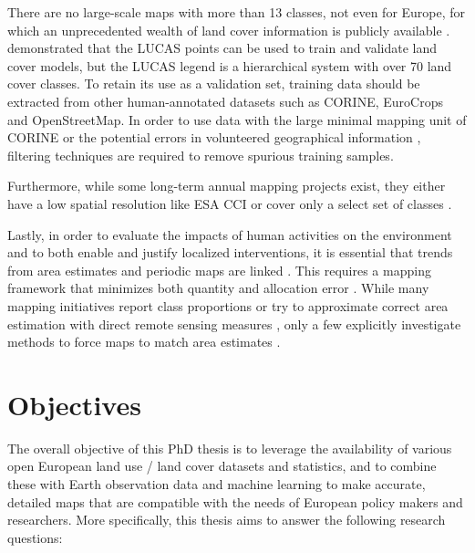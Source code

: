     There are no large-scale maps with more than 13 classes, not even for Europe, for which an unprecedented wealth of land cover information is publicly available \citep{dandrimont2020harmonised}. \citet{pflugmacher2019mapping} demonstrated that the LUCAS points can be used to train and validate land cover models, but the LUCAS legend is a hierarchical system with over 70 land cover classes. To retain its use as a validation set, training data should be extracted from other human-annotated datasets such as CORINE, EuroCrops \citep{schneider2023eurocrops} and OpenStreetMap. In order to use data with the large minimal mapping unit of CORINE or the potential errors in volunteered geographical information \citep{neis2014recent}, filtering techniques are required to remove spurious training samples.

    Furthermore, while some long-term annual mapping projects exist, they either have a low spatial resolution like ESA CCI \citep{harper202229} or cover only a select set of classes \citep{hansen2022global}.

    Lastly, in order to evaluate the impacts of human activities on the environment and to both enable and justify localized interventions, it is essential that trends from area estimates and periodic maps are linked \citep{olofsson2014good,szantoi2020addressing,winkler2021global}. This requires a mapping framework that minimizes both quantity and allocation error \citep{pontius2011death}. While many mapping initiatives report class proportions \citep{pflugmacher2019mapping} or try to approximate correct area estimation with direct remote sensing measures \citep{kleinewillinghofer2022unbiased}, only a few explicitly investigate methods to force maps to match area estimates \citep{strahler1980use,horvath2021comparison}.
    

\section{Objectives}
\label{sec:research_objectives}
The overall objective of this PhD thesis is to leverage the availability of various open European land use / land cover datasets and statistics, and to combine these with Earth observation data and machine learning to make accurate, detailed maps that are compatible with the needs of European policy makers and researchers. More specifically, this thesis aims to answer the following research questions:

